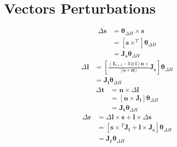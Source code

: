 \section{Vectors Perturbations}
\begin{equation}
    \begin{split}
        \Delta \mathbf{s} &= \boldsymbol{\theta}_{\Delta H} \times \mathbf{s}\\
        &= \left[\mathbf{s} \times ^T\right] \boldsymbol{\theta}_{\Delta H} \\
        &= \mathbf{J}_{\mathbf{s}} \boldsymbol{\theta}_{\Delta H}
    \end{split}
\end{equation}
\begin{equation}
    \begin{split}
        \Delta \mathbf{l} &= \left[\frac{\left(\mathbf{I}_{3\times3} - \mathbf{l} \otimes \mathbf{l}\right) \mathbf{n} \times}{||\mathbf{s} \times \mathbf{n}||} \mathbf{J}_{\mathbf{s}}\right] \boldsymbol{\theta}_{\Delta H} \\
        &= \mathbf{J}_{\mathbf{l}} \boldsymbol{\theta}_{\Delta H}
    \end{split}
\end{equation}
\begin{equation}
    \begin{split}
        \Delta \mathbf{t} &= \mathbf{n} \times \Delta \mathbf{l}\\
        &= \left[\mathbf{n} \times \mathbf{J}_\mathbf{l} \right]\boldsymbol{\theta}_{\Delta H}\\
        &= \mathbf{J}_\mathbf{t} \boldsymbol{\theta}_{\Delta H}
    \end{split}
\end{equation}
\begin{equation}
    \begin{split}
        \Delta \mathbf{r} &= \Delta \mathbf{l} \times \mathbf{s} + \mathbf{l} \times \Delta \mathbf{s}\\
        &= \left[{\mathbf{s} \times}^T \mathbf{J}_{\mathbf{l}} + {\mathbf{l} \times} \mathbf{J}_{\mathbf{s}}\right] \boldsymbol{\theta}_{\Delta H} \\
        &= \mathbf{J}_\mathbf{r} \boldsymbol{\theta}_{\Delta H}
    \end{split}
\end{equation}
